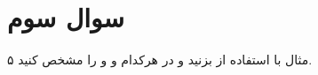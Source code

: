 \section{سوال سوم}

۵ مثال با استفاده از  بزنید و در هرکدام  و  و  را مشخص کنید.


\begin{qsolve}[]
	
\end{qsolve}